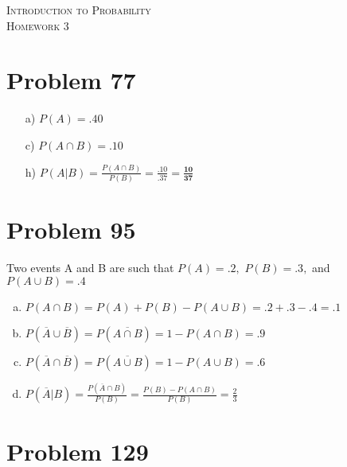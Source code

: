 \documentclass{article}
\newcommand{\classname}{
Introduction to Probability
}
\newcommand{\assignment}{
3
}
\begin{document}
\begin{center}
  \textsc{\Large \classname}\\[.3cm]
  \textsc{\Large Homework \assignment}
\end{center}

\section*{Problem 77}
\begin{enumerate}[a)]
\item[a)] $P(A) = \mathbf{.40}$
\item[c)] $P(A \cap B) = \mathbf{.10}$
\item[h)] $P(A|B) = \frac{P(A \cap B)}{P(B)} = \frac{.10}{.37} = \mathbf{\frac{10}{37}}$
\end{enumerate}

\section*{Problem 95}
Two events A and B are such that $P(A) = .2,$ $P(B) = .3,$ and $P(A \cup B) = .4$
\begin{enumerate}[a)]
\item $P(A \cap B) = P(A) + P(B) - P(A \cup B) = .2 + .3 - .4 = \mathbf{.1}$
\item $P(\overline{A} \cup \overline{B}) = P(\overline{A \cap B}) = 1 - P(A \cap B) = \mathbf{.9}$
\item $P(\overline{A} \cap \overline{B}) = P(\overline{A \cup B}) = 1 - P(A \cup B) = \mathbf{.6}$
\item $P(\overline{A}|B) = \frac{P(\overline{A} \cap B)}{P(B)} = \frac{P(B) - P(A \cap B)}{P(B)} = \frac{2}{3}$
\end{enumerate}

\section*{Problem 129}
\end{document}
